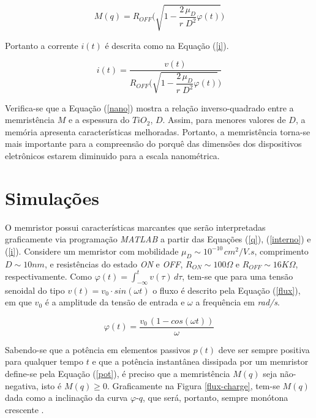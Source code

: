 \documentclass{ceel}
\begin{document}
\begin{multicols}{2}
\begin{equation}\label{nano}
M(q)=R_{OFF}\Bigg(\sqrt{1-\dfrac{2\, \mu_D}{r\; D^2}\varphi(t) }\Bigg)
\end{equation}
\vspace{0.05cm}

Portanto a corrente $i(t)$ é descrita como na Equação (\ref{i}).

\begin{equation}\label{i}
i(t)=\dfrac{v(t)}{R_{OFF}\Bigg(\sqrt{1-\dfrac{2\, \mu_D}{r\; D^2}\varphi(t) }\Bigg)}
\end{equation} 
\vspace{0.05cm}

Verifica-se que a Equação (\ref{nano}) mostra a relação inverso-quadrado entre a memristência $M$ e a espessura do $TiO_2$, $D$. Assim, para menores valores de $D$, a memória apresenta características melhoradas. Portanto, a memristência torna-se mais importante para a compreensão do porquê das dimensões dos dispositivos eletrônicos estarem diminuido para a escala nanométrica.

\section{Simulações} \label{sim}
O memristor possui características marcantes que serão interpretadas graficamente via programação \emph{MATLAB} a partir das Equações (\ref{q}), (\ref{interno}) e (\ref{i}). Considere um memristor com mobilidade $\mu_D \sim 10^{-10\,} cm^2/V.s$, comprimento $D\sim10nm$, e resistências do estado \textit{ON} e \textit{OFF}, $R_{ON}\sim 100\Omega$ e $R_{OFF}\sim 16K\Omega$, respectivamente. Como $\varphi(t)=\int_{-\infty}^t v(\tau)\, d\tau$, tem-se que para uma tensão senoidal do tipo $v(t)=v_0\cdot sin(\omega t)$ o fluxo é descrito pela Equação (\ref{flux}), em que $v_0$ é a amplitude da tensão de entrada e $\omega$ a frequência em \textit{rad/s}.

\begin{equation}\label{flux}
\varphi(t) = \dfrac{v_0\, (1-cos(\omega t))}{\omega}
\end{equation}

Sabendo-se que a potência em elementos passivos $p(t)$ deve ser sempre positiva para qualquer tempo $t$ e que a potência instantânea dissipada por um memristor define-se pela Equação (\ref{pot}), é preciso que a memristência $M(q)$ seja não-negativa, isto é $M(q)\geq 0$. Graficamente na Figura \ref{flux-charge}, tem-se $M(q)$ dada como a inclinação da curva $\varphi$-$q$, que será, portanto, sempre monótona crescente \cite{artigo}.


\end{multicols}
\end{document}
